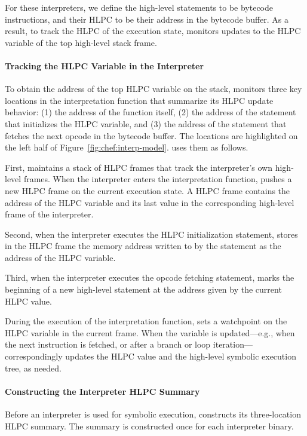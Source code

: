 For these interpreters, we define the \chef high-level statements to be bytecode instructions, and their HLPC to be their address in the bytecode buffer.
%
As a result, to track the HLPC of the execution state, \chef monitors updates to the HLPC variable of the top high-level stack frame.

\paragraph{Tracking the HLPC Variable in the Interpreter}

To obtain the address of the top HLPC variable on the stack, \chef monitors three key locations in the interpretation function that summarize its HLPC update behavior:
%
(1) the address of the function itself, (2) the address of the statement that initializes the HLPC variable, and (3) the address of the statement that fetches the next opcode in the bytecode buffer.  The locations are highlighted on the left half of Figure~\ref{fig:chef:interp-model}.
%
\chef uses them as follows.

First, \chef maintains a stack of HLPC frames that track the interpreter's own high-level frames.
%
When the interpreter enters the interpretation function, \chef pushes a new HLPC frame on the current execution state.  A HLPC frame contains the address of the HLPC variable and its last value in the corresponding high-level frame of the interpreter.

Second, when the interpreter executes the HLPC initialization statement, \chef stores in the HLPC frame the memory address written to by the statement as the address of the HLPC variable.

Third, when the interpreter executes the opcode fetching statement, \chef marks the beginning of a new high-level statement at the address given by the current HLPC value.

During the execution of the interpretation function, \chef sets a watchpoint on the HLPC variable in the current frame.
%
When the variable is updated---e.g., when the next instruction is fetched, or after a branch or loop iteration---\chef correspondingly updates the HLPC value and the high-level symbolic execution tree, as needed.

\paragraph{Constructing the Interpreter HLPC Summary}

Before an interpreter is used for symbolic execution, \chef constructs its three-location HLPC summary.
%
The summary is constructed once for each interpreter binary.

